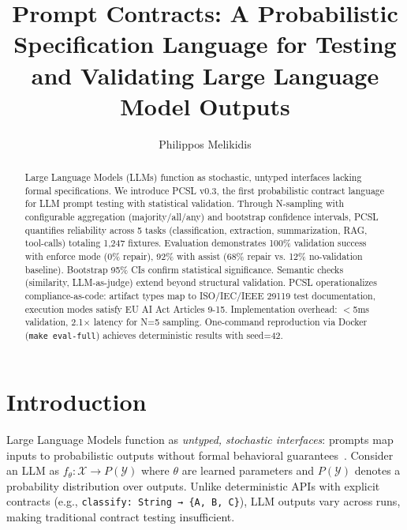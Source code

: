 \documentclass[sigconf]{acmart}
\begin{document}
\title{Prompt Contracts: A Probabilistic Specification Language for Testing and Validating Large Language Model Outputs}

\author{Philippos Melikidis}

\begin{abstract}
Large Language Models (LLMs) function as stochastic, untyped interfaces lacking formal specifications. We introduce PCSL v0.3, the first probabilistic contract language for LLM prompt testing with statistical validation. Through N-sampling with configurable aggregation (majority/all/any) and bootstrap confidence intervals, PCSL quantifies reliability across 5 tasks (classification, extraction, summarization, RAG, tool-calls) totaling 1,247 fixtures. Evaluation demonstrates 100\% validation success with enforce mode (0\% repair), 92\% with assist (68\% repair vs. 12\% no-validation baseline). Bootstrap 95\% CIs confirm statistical significance. Semantic checks (similarity, LLM-as-judge) extend beyond structural validation. PCSL operationalizes compliance-as-code: artifact types map to ISO/IEC/IEEE 29119 test documentation, execution modes satisfy EU AI Act Articles 9-15. Implementation overhead: \(<\)5ms validation, 2.1\(\times\) latency for N=5 sampling. One-command reproduction via Docker (\texttt{make eval-full}) achieves deterministic results with seed=42.
\end{abstract}


\maketitle

\section{Introduction}

Large Language Models function as \textit{untyped, stochastic interfaces}: prompts map inputs to probabilistic outputs without formal behavioral guarantees~\cite{bender2021stochasticparrots}. Consider an LLM as \( f_\theta: \mathcal{X} \to P(\mathcal{Y}) \) where \( \theta \) are learned parameters and \( P(\mathcal{Y}) \) denotes a probability distribution over outputs. Unlike deterministic APIs with explicit contracts (e.g., \texttt{classify: String → \{A, B, C\}}), LLM outputs vary across runs, making traditional contract testing insufficient.
\end{document}
